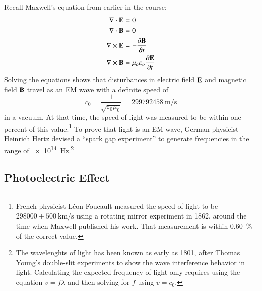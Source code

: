 \documentclass[11pt]{article}
\newcommand{\pic}[2]{\texttt{[image: \#2]}}
\newcommand{\mb}[1]{\ensuremath\mathbf{#1}}
\begin{document}
Recall Maxwell's equation from earlier in the course:
\begin{align*}
  \nabla\cdot\mb{E} &= 0\\
  \nabla\cdot\mb{B} &= 0\\
  \nabla\times\mb{E} &=-\frac{\partial\mb{B}}{\partial t}\\
  \nabla\times\mb{B} &=\mu_o\varepsilon_o\frac{\partial\mb{E}}{\partial t}
\end{align*}
Solving the equations shows that disturbances in electric field $\mb{E}$ and
magnetic field $\mb{B}$ travel as an EM wave with a definite speed of
\begin{equation}
  c_0=\frac{1}{\sqrt{\varepsilon_0\mu_0}}=\SI{299792458}{\metre\per\second}
\end{equation}
in a vacuum. At that time, the speed of light was measured to be within one
percent of this value.\footnote{French physicist L\'{e}on Foucault measured the
  speed of light to be $\num{298000}\pm\SI{500}{\kilo\metre\per\second}$ using
  a rotating mirror experiment in 1862, around the time when Maxwell published
  his work. That measurement is within \SI{.60}{\percent} of the correct value.}
To prove that light is an EM wave, German physicist Heinrich Hertz
devised a ``spark gap experiment'' to generate frequencies in the range of
\SI{e14}{\hertz}.\footnote{The wavelenghts of light has been known as early as
  1801, after Thomas Young's double-slit experiments to show the wave
  interference behavior in light. Calculating the expected frequency of light
  only requires using the equation $v=f\lambda$ and then solving for $f$ using
  $v=c_0$.}

\subsection{Photoelectric Effect}
\end{document}
